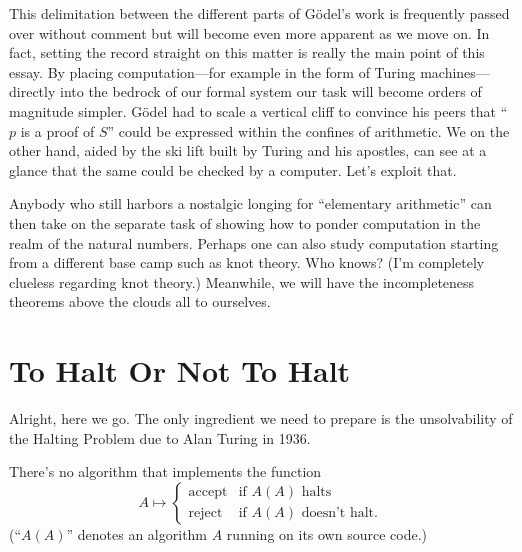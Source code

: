 \documentclass{article}
\theoremstyle{customstyle}
\begin{document}
This delimitation between the different parts of Gödel's work is frequently passed over without comment but will become even more apparent as we move on. In fact, setting the record straight on this matter is really the main point of this essay. By placing computation---for example in the form of Turing machines---directly into the bedrock of our formal system our task will become orders of magnitude simpler. Gödel had to scale a vertical cliff to convince his peers that ``$p$ is a proof of $S$'' could be expressed within the confines of arithmetic. We on the other hand, aided by the ski lift built by Turing and his apostles, can see at a glance that the same could be checked by a computer. Let's exploit that.

Anybody who still harbors a nostalgic longing for ``elementary arithmetic'' can then take on the separate task of showing how to ponder computation in the realm of the natural numbers. Perhaps one can also study computation starting from a different base camp such as knot theory. Who knows? (I'm completely clueless regarding knot theory.) Meanwhile, we will have the incompleteness theorems above the clouds all to ourselves.

\section{To Halt Or Not To Halt}

Alright, here we go. The only ingredient we need to prepare is the unsolvability of the Halting Problem due to Alan Turing in 1936.

\begin{lemma}
There's no algorithm that implements the function
\[
A \mapsto
\begin{cases}
\text{accept} & \text{if $A(A)$ halts}\\
\text{reject} & \text{if $A(A)$ doesn't halt.}
\end{cases}
\]
(``$A(A)$'' denotes an algorithm $A$ running on its own source code.)
\end{lemma}
\end{document}
